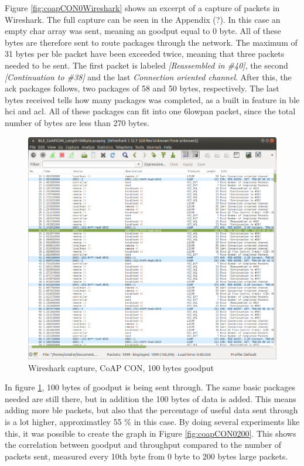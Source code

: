 Figure \ref{fig:coapCON0Wireshark} shows an excerpt of a capture of packets in Wireshark. The full capture can be seen in the Appendix (?). In this case an empty char array was sent, meaning an goodput equal to 0 byte. All of these bytes are therefore sent to route packages through the network. The maximum of 31 bytes per \gls{ble} packet have been exceeded twice, meaning that three packets needed to be sent. The first packet is labeled \textit{[Reassembled in \#40]}, the second \textit{[Continuation to \#38]} and the last \textit{Connection oriented channel}. After this, the \gls{ack} packages follows, two packages of 58 and 50 bytes, respectively. The last bytes received tells how many packages was completed, as a built in feature in \gls{ble}  \gls{hci}  and \gls{acl}. All of these packages can fit into one \gls{6lowpan} packet, since the total number of bytes are less than 270 bytes. 


\begin{figure}[ht]
    \centering
    \includegraphics[width=\textwidth]{wiresharkCON100bytes.png}    
    \caption{Wireshark capture, CoAP CON, 100 bytes goodput}
    \label{fig:coapCON100Wireshark}
\end{figure}

In figure \ref{fig:coapCON100Wireshark}, 100 bytes of goodput is being sent through. The same basic packages needed are still there, but in addition the 100 bytes of data is added. This means adding more \gls{ble} packets, but also that the percentage of useful data sent through is a lot higher, approximatley 55 \% in this case. By doing several experiments like this, it was possible to create the graph in Figure \ref{fig:coapCON0200}. This shows the correlation between goodput and throughput compared to the number of packets sent, measured every 10th byte from 0 byte to 200 bytes large packets.


